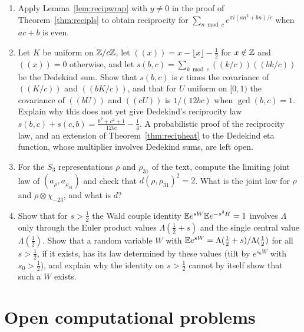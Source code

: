 \begin{enumerate}
\item\label{ex:recipgenls} Apply Lemma~\ref{lem:recipwrap} with $y\ne0$ in the proof of Theorem~\ref{thm:recipls} to obtain reciprocity for $\sum_{n\bmod c}e^{\pi i(an^2+bn)/c}$ when $ac+b$ is even.
\item\label{ex:recipdedekind} Let $K$ be uniform on $\mathbb{Z}/c\mathbb{Z}$, let $((x))=x-\lfloor x\rfloor-\frac12$ for $x\notin\mathbb{Z}$ and $((x))=0$ otherwise, and let $s(b,c)=\sum_{k\bmod c}((k/c))((bk/c))$ be the Dedekind sum. Show that $s(b,c)$ is $c$ times the covariance of $((K/c))$ and $((bK/c))$, and that for $U$ uniform on $[0,1)$ the covariance of $((bU))$ and $((cU))$ is $1/(12bc)$ when $\gcd(b,c)=1$. Explain why this does not yet give Dedekind's reciprocity law $s(b,c)+s(c,b)=\frac{b^2+c^2+1}{12bc}-\frac14$. A probabilistic proof of the reciprocity law, and an extension of Theorem~\ref{thm:recipheat} to the Dedekind eta function, whose multiplier involves Dedekind sums, are left open.
\item\label{ex:recipjoint} For the $S_3$ representations $\rho$ and $\rho_{31}$ of the text, compute the limiting joint law of $(a_\rho,a_{\rho_{31}})$ and check that $d(\rho,\rho_{31})^2=2$. What is the joint law for $\rho$ and $\rho\otimes\chi_{-23}$, and what is $d$?
\item\label{ex:recipwald} Show that for $s>\frac12$ the Wald couple identity $\mathbb{E} e^{sW}\mathbb{E} e^{-s^2H}=1$ involves $\Lambda$ only through the Euler product values $\Lambda(\frac12+s)$ and the single central value $\Lambda(\frac12)$. Show that a random variable $W$ with $\mathbb{E} e^{sW}=\Lambda(\frac12+s)/\Lambda(\frac12)$ for all $s>\frac12$, if it exists, has its law determined by these values (tilt by $e^{s_0W}$ with $s_0>\frac12$), and explain why the identity on $s>\frac12$ cannot by itself show that such a $W$ exists.
\end{enumerate}

\section{Open computational problems}


